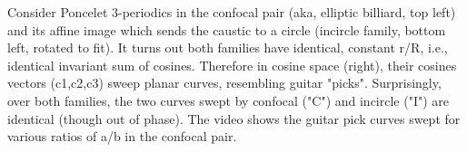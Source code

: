 Consider Poncelet 3-periodics in the confocal pair (aka, elliptic billiard, top left) and its affine image which sends the caustic to a circle (incircle family, bottom left, rotated to fit). It turns out both families have identical, constant r/R, i.e., identical invariant sum of cosines. Therefore in cosine space (right), their cosines vectors (c1,c2,c3) sweep planar curves, resembling guitar "picks". Surprisingly, over both families, the two curves swept by confocal ("C") and incircle ("I") are identical (though out of phase). The video shows the guitar pick curves swept for various ratios of a/b in the confocal pair.